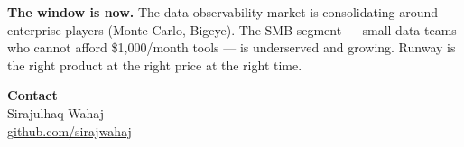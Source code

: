 \vspace{8pt}

\begin{insight}
\textbf{The window is now.} The data observability market is consolidating around
enterprise players (Monte Carlo, Bigeye). The SMB segment — small data teams who cannot
afford \$1,000/month tools — is underserved and growing. Runway is the right product
at the right price at the right time.
\end{insight}

\vspace{10pt}

\begin{center}
{\large\bfseries\color{primary} Contact}\\[6pt]
{\normalsize Sirajulhaq Wahaj}\\
{\small\color{soft} \href{https://github.com/sirajwahaj}{github.com/sirajwahaj}}\\
\end{center}
